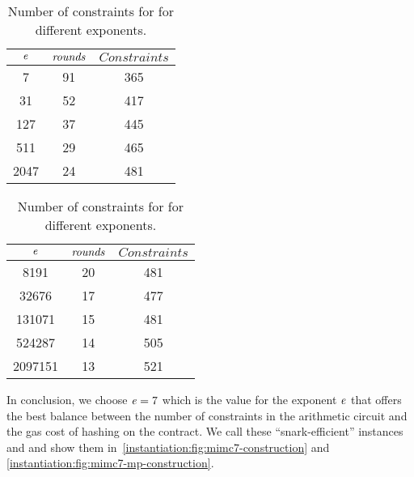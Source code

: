 \begin{table}
    \begin{minipage}[t]{0.50\textwidth}
        \centering
        \begin{tabular}{c c c}
            \midrule
            $\mathit{e}{}$ & $\mathit{rounds}$ & $Constraints$ \\ [0.5ex]
            \midrule
            7 & 91 & 365\\
            \midrule
            31 & 52 & 417\\
            \midrule
            127 & 37 & 445\\
            \midrule
            511 & 29 & 465\\
            \midrule
            2047 & 24 & 481\\
            \bottomrule
        \end{tabular}
    \end{minipage}%
    \begin{minipage}[t]{0.50\textwidth}
        \centering
        \begin{tabular}{c c c}
            \midrule
            $\mathit{e}{}$ & $\mathit{rounds}$ & $Constraints$ \\ [0.5ex]
            \midrule
            8191 & 20 & 481\\
            \midrule
            32676 & 17 & 477\\
            \midrule
            131071 & 15 & 481\\
            \midrule
            524287 & 14 & 505\\
            \midrule
            2097151 & 13 & 521\\
            \bottomrule
        \end{tabular}
    \end{minipage}%
    \caption{Number of constraints for \mimcMP{} for different exponents.}\label{table:mimc-exp-analysis}
\end{table}

In conclusion, we choose $\mathit{e}{} = 7$ which is the value for the exponent $\mathit{e}{}$ that offers the best balance between the number of constraints in the arithmetic circuit and the gas cost of hashing on the contract. We call these ``snark-efficient'' instances \mimcSevenPrime{} and \mimcSevenMPPrime{} and show them in~\cref{instantiation:fig:mimc7-construction} and \cref{instantiation:fig:mimc7-mp-construction}.

